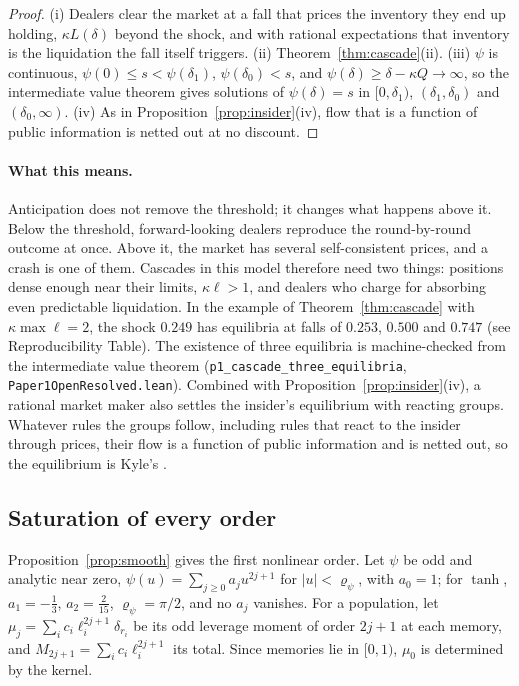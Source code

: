 \documentclass[12pt]{article}
\theoremstyle{definition}
\theoremstyle{remark}
\begin{document}
\begin{proof}
(i) Dealers clear the market at a fall that prices the inventory they end up holding, $\kappa L(\delta)$ beyond the shock, and with rational expectations that inventory is the liquidation the fall itself triggers. (ii) Theorem~\ref{thm:cascade}(ii). (iii) $\psi$ is continuous, $\psi(0)\le s<\psi(\delta_1)$, $\psi(\delta_0)<s$, and $\psi(\delta)\ge\delta-\kappa Q\to\infty$, so the intermediate value theorem gives solutions of $\psi(\delta)=s$ in $[0,\delta_1)$, $(\delta_1,\delta_0)$ and $(\delta_0,\infty)$. (iv) As in Proposition~\ref{prop:insider}(iv), flow that is a function of public information is netted out at no discount.
\end{proof}

\paragraph{What this means.} Anticipation does not remove the threshold; it changes what happens above it. Below the threshold, forward-looking dealers reproduce the round-by-round outcome at once. Above it, the market has several self-consistent prices, and a crash is one of them. Cascades in this model therefore need two things: positions dense enough near their limits, $\kappa\ell>1$, and dealers who charge for absorbing even predictable liquidation. In the example of Theorem~\ref{thm:cascade} with $\kappa\max\ell=2$, the shock $0.249$ has equilibria at falls of $0.253$, $0.500$ and $0.747$ (see Reproducibility Table). The existence of three equilibria is machine-checked from the intermediate value theorem (\texttt{p1\_cascade\_three\_equilibria}, \nolinkurl{Paper1OpenResolved.lean}). Combined with Proposition~\ref{prop:insider}(iv), a rational market maker also settles the insider's equilibrium with reacting groups. Whatever rules the groups follow, including rules that react to the insider through prices, their flow is a function of public information and is netted out, so the equilibrium is Kyle's \citep{kyle1985}.

\subsection{Saturation of every order}

Proposition~\ref{prop:smooth} gives the first nonlinear order. Let $\psi$ be odd and analytic near zero, $\psi(u)=\sum_{j\ge0}a_ju^{2j+1}$ for $|u|<\varrho_\psi$, with $a_0=1$; for $\tanh$, $a_1=-\frac13$, $a_2=\frac2{15}$, $\varrho_\psi=\pi/2$, and no $a_j$ vanishes. For a population, let $\mu_j=\sum_ic_i\ell_i^{2j+1}\delta_{r_i}$ be its odd leverage moment of order $2j+1$ at each memory, and $M_{2j+1}=\sum_ic_i\ell_i^{2j+1}$ its total. Since memories lie in $[0,1)$, $\mu_0$ is determined by the kernel.
\end{document}
